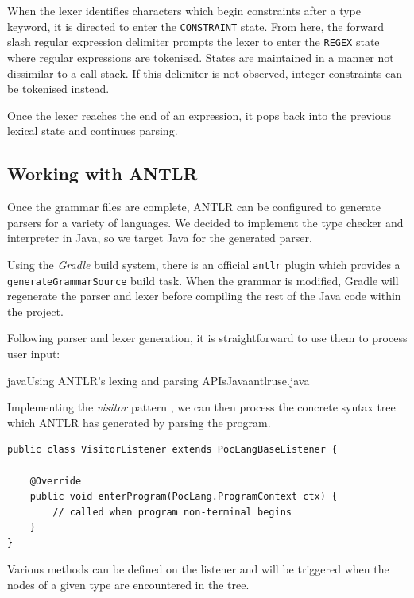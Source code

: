 \documentclass[a4paper,openany,12pt]{book}
\begin{document}



When the lexer identifies characters which begin constraints after a type keyword, it is directed to enter the
\texttt{CONSTRAINT} state.
From here, the forward slash regular expression delimiter prompts the lexer to enter the \texttt{REGEX} state where
regular expressions are tokenised.
States are maintained in a manner not dissimilar to a call stack.
If this delimiter is not observed, integer constraints can be tokenised instead.

Once the lexer reaches the end of an expression, it pops back into the previous lexical state and continues parsing.

\subsection{Working with ANTLR}

Once the grammar files are complete, ANTLR can be configured to generate parsers for a variety of languages.
We decided to implement the type checker and interpreter in Java, so we target Java for the generated parser.

Using the \emph{Gradle} build system, there is an official \texttt{antlr} plugin which provides a
\texttt{generateGrammarSource} build task.
When the grammar is modified, Gradle will regenerate the parser and lexer before compiling the rest of the Java
code within the project.

Following parser and lexer generation, it is straightforward to use them to process user input:

\begin{mycodefile}{java}{\label{code:antlr:2}Using ANTLR's lexing and parsing APIs}{Java}{antlruse.java}
    \vspace{0.5em}

    Implementing the \emph{visitor} pattern \citep{gof1995}, we can then process the concrete syntax tree which ANTLR
    has generated by parsing the program.
    \vspace{0.5em}

    \begin{verbatim}
public class VisitorListener extends PocLangBaseListener {

    @Override
    public void enterProgram(PocLang.ProgramContext ctx) {
        // called when program non-terminal begins
    }
}
    \end{verbatim}
    Various methods can be defined on the listener and will be triggered when the nodes of a given type are encountered
    in the tree.
\end{mycodefile}
\end{document}
